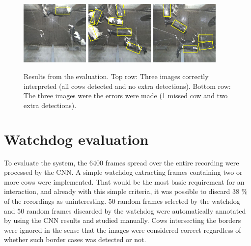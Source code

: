 \documentclass[10pt,a4paper,twocolumn]{article}
\begin{document}
\begin{figure}[tb]
\begin{center}
  \includegraphics[width=0.3\textwidth]{bad/1419743355933936.jpg}
  \includegraphics[width=0.3\textwidth]{bad/1420050868326145.jpg}
  \includegraphics[width=0.3\textwidth]{bad/1420185482574217.jpg}
\end{center}
  \caption{Results from the evaluation. Top row: Three images correctly interpreted (all cows detected and no extra detections). Bottom row: The three images were the errors were made (1 missed cow and two extra detections).}
  \label{fig:res}
\end{figure}

\section{Watchdog evaluation}
To evaluate the system, the 6400 frames spread over the entire recording were processed by the CNN. A simple watchdog extracting frames containing two or more cows were implemented. That would be the most basic requirement for an interaction, and already with this simple criteria, it was possible to discard 38 \% of the recordings as uninteresting. 50 random frames selected by the watchdog and 50 random frames discarded by the watchdog were automatically annotated by using the CNN results and studied manually. Cows intersecting the borders were ignored in the sense that the images were considered correct regardless of whether such border cases was detected or not.
\end{document}
